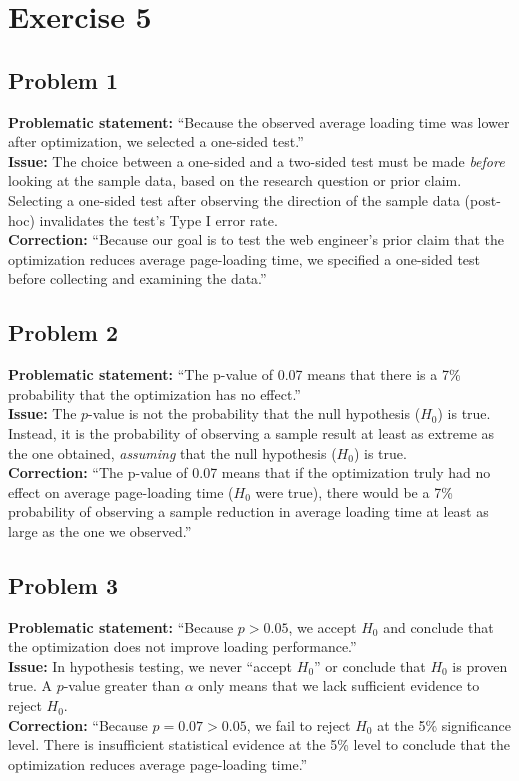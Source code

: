 \documentclass[11pt]{article}
\begin{document}
\section*{Exercise 5}

\subsection*{Problem 1}
\noindent\textbf{Problematic statement:} ``Because the observed average loading time was lower after optimization, we selected a one-sided test.''\\
\textbf{Issue:} The choice between a one-sided and a two-sided test must be made \emph{before} looking at the sample data, based on the research question or prior claim. Selecting a one-sided test after observing the direction of the sample data (post-hoc) invalidates the test's Type I error rate.\\
\textbf{Correction:} ``Because our goal is to test the web engineer's prior claim that the optimization reduces average page-loading time, we specified a one-sided test before collecting and examining the data.''

\subsection*{Problem 2}
\noindent\textbf{Problematic statement:} ``The p-value of 0.07 means that there is a 7\% probability that the optimization has no effect.''\\
\textbf{Issue:} The $p$-value is not the probability that the null hypothesis ($H_0$) is true. Instead, it is the probability of observing a sample result at least as extreme as the one obtained, \emph{assuming} that the null hypothesis ($H_0$) is true.\\
\textbf{Correction:} ``The p-value of 0.07 means that if the optimization truly had no effect on average page-loading time ($H_0$ were true), there would be a 7\% probability of observing a sample reduction in average loading time at least as large as the one we observed.''

\subsection*{Problem 3}
\noindent\textbf{Problematic statement:} ``Because $p > 0.05$, we accept $H_0$ and conclude that the optimization does not improve loading performance.''\\
\textbf{Issue:} In hypothesis testing, we never ``accept $H_0$'' or conclude that $H_0$ is proven true. A $p$-value greater than $\alpha$ only means that we lack sufficient evidence to reject $H_0$.\\
\textbf{Correction:} ``Because $p = 0.07 > 0.05$, we fail to reject $H_0$ at the 5\% significance level. There is insufficient statistical evidence at the 5\% level to conclude that the optimization reduces average page-loading time.''
\end{document}
